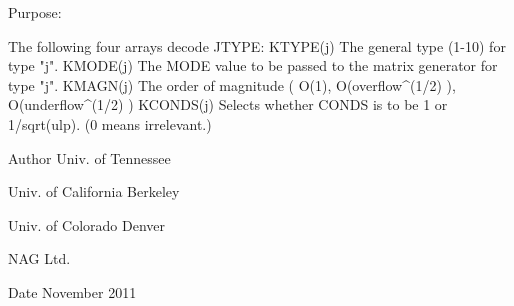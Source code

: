 \begin{DoxyParagraph}{Purpose\+: }
\begin{DoxyVerb}
             The following four arrays decode JTYPE:
     KTYPE(j)        The general type (1-10) for type "j".
     KMODE(j)        The MODE value to be passed to the matrix
                     generator for type "j".
     KMAGN(j)        The order of magnitude ( O(1),
                     O(overflow^(1/2) ), O(underflow^(1/2) )
     KCONDS(j)       Selects whether CONDS is to be 1 or
                     1/sqrt(ulp).  (0 means irrelevant.)\end{DoxyVerb}
 
\end{DoxyParagraph}
\begin{DoxyAuthor}{Author}
Univ. of Tennessee 

Univ. of California Berkeley 

Univ. of Colorado Denver 

N\+A\+G Ltd. 
\end{DoxyAuthor}
\begin{DoxyDate}{Date}
November 2011 
\end{DoxyDate}
\hypertarget{group__double__eig_ga5ef9e79152c39b707e749d783f40e57b}{}
